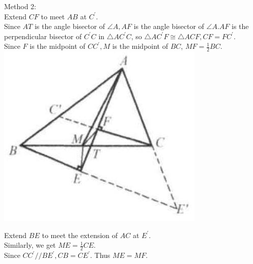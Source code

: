 \documentclass[10pt]{article}
\begin{document}
Method 2:\\
Extend \(C F\) to meet \(A B\) at \(C^{\prime}\).\\
Since \(A T\) is the angle bisector of \(\angle A, A F\) is the angle bisector of \(\angle A . A F\) is the perpendicular bisector of \(C^{\prime} C\) in \(\triangle A C^{\prime} C\), so \(\triangle A C^{\prime} F \cong \triangle A C F, C F=F C^{\prime}\).\\
Since \(F\) is the midpoint of \(C C^{\prime}, M\) is the midpoint of \(B C\), \(M F=\frac{1}{2} B C\).\\
\includegraphics[max width=\textwidth, center]{2025_04_17_97bc1f7e44d93c271a88g-069}

Extend \(B E\) to meet the extension of \(A C\) at \(E^{\prime}\).\\
Similarly, we get \(M E=\frac{1}{2} C E\).\\
Since \(C C^{\prime} / / B E^{\prime}, C B=C E^{\prime}\). Thus \(M E=M F\).
\end{document}
